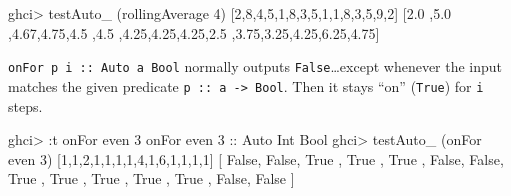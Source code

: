 \documentclass[]{article}
\newenvironment{Shaded}{}{}
\newcommand{\DataTypeTok}[1]{\textcolor[rgb]{0.56,0.13,0.00}{#1}}
\newcommand{\DecValTok}[1]{\textcolor[rgb]{0.25,0.63,0.44}{#1}}
\newcommand{\FloatTok}[1]{\textcolor[rgb]{0.25,0.63,0.44}{#1}}
\newcommand{\FunctionTok}[1]{\textcolor[rgb]{0.02,0.16,0.49}{#1}}
\newcommand{\NormalTok}[1]{#1}
\newcommand{\OtherTok}[1]{\textcolor[rgb]{0.00,0.44,0.13}{#1}}
\renewcommand{\href}[2]{#2\footnote{\url{#1}}}
\begin{document}
\begin{Shaded}
\begin{Highlighting}[]
\NormalTok{ghci}\FunctionTok{>}\NormalTok{ testAuto_ (rollingAverage }\DecValTok{4}\NormalTok{) [}\DecValTok{2}\NormalTok{,}\DecValTok{8}\NormalTok{,}\DecValTok{4}\NormalTok{,}\DecValTok{5}\NormalTok{,}\DecValTok{1}\NormalTok{,}\DecValTok{8}\NormalTok{,}\DecValTok{3}\NormalTok{,}\DecValTok{5}\NormalTok{,}\DecValTok{1}\NormalTok{,}\DecValTok{1}\NormalTok{,}\DecValTok{8}\NormalTok{,}\DecValTok{3}\NormalTok{,}\DecValTok{5}\NormalTok{,}\DecValTok{9}\NormalTok{,}\DecValTok{2}\NormalTok{]}
\NormalTok{[}\FloatTok{2.0}\NormalTok{ ,}\FloatTok{5.0}\NormalTok{ ,}\FloatTok{4.67}\NormalTok{,}\FloatTok{4.75}\NormalTok{,}\FloatTok{4.5}
\NormalTok{,}\FloatTok{4.5}\NormalTok{ ,}\FloatTok{4.25}\NormalTok{,}\FloatTok{4.25}\NormalTok{,}\FloatTok{4.25}\NormalTok{,}\FloatTok{2.5}
\NormalTok{,}\FloatTok{3.75}\NormalTok{,}\FloatTok{3.25}\NormalTok{,}\FloatTok{4.25}\NormalTok{,}\FloatTok{6.25}\NormalTok{,}\FloatTok{4.75}\NormalTok{]}
\end{Highlighting}
\end{Shaded}

\begin{description}
\tightlist
\item[\href{https://github.com/mstksg/inCode/tree/master/code-samples/machines/Auto.hs\#L125-L146}{onFor}]
\texttt{onFor\ p\ i\ ::\ Auto\ a\ Bool} normally outputs
\texttt{False}\ldots{}except whenever the input matches the given predicate
\texttt{p\ ::\ a\ -\textgreater{}\ Bool}. Then it stays ``on'' (\texttt{True})
for \texttt{i} steps.
\end{description}

\begin{Shaded}
\begin{Highlighting}[]
\NormalTok{ghci}\FunctionTok{>} \FunctionTok{:}\NormalTok{t onFor even }\DecValTok{3}
\NormalTok{onFor even }\DecValTok{3}\OtherTok{ ::} \DataTypeTok{Auto} \DataTypeTok{Int} \DataTypeTok{Bool}
\NormalTok{ghci}\FunctionTok{>}\NormalTok{ testAuto_ (onFor even }\DecValTok{3}\NormalTok{) [}\DecValTok{1}\NormalTok{,}\DecValTok{1}\NormalTok{,}\DecValTok{2}\NormalTok{,}\DecValTok{1}\NormalTok{,}\DecValTok{1}\NormalTok{,}\DecValTok{1}\NormalTok{,}\DecValTok{1}\NormalTok{,}\DecValTok{4}\NormalTok{,}\DecValTok{1}\NormalTok{,}\DecValTok{6}\NormalTok{,}\DecValTok{1}\NormalTok{,}\DecValTok{1}\NormalTok{,}\DecValTok{1}\NormalTok{,}\DecValTok{1}\NormalTok{]}
\NormalTok{[ }\DataTypeTok{False}\NormalTok{, }\DataTypeTok{False}\NormalTok{, }\DataTypeTok{True}\NormalTok{ , }\DataTypeTok{True}\NormalTok{ , }\DataTypeTok{True}
\NormalTok{, }\DataTypeTok{False}\NormalTok{, }\DataTypeTok{False}\NormalTok{, }\DataTypeTok{True}\NormalTok{ , }\DataTypeTok{True}\NormalTok{ , }\DataTypeTok{True}
\NormalTok{, }\DataTypeTok{True}\NormalTok{ , }\DataTypeTok{True}\NormalTok{ , }\DataTypeTok{False}\NormalTok{, }\DataTypeTok{False}\NormalTok{ ]}
\end{Highlighting}
\end{Shaded}
\end{document}
